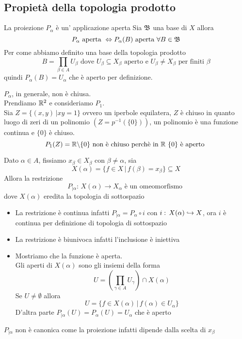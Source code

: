 \subsection{Propiet\`a della topologia prodotto}
\begin{prop}La proiezione $P_\alpha$  \`e un' applicazione aperta
\proof Sia $\mathfrak{B}$ una base di $X$ allora 
$$ P_\alpha \text{ aperta } \Leftrightarrow P_ \alpha(B) \text{ aperta } \forall B \in \mathfrak{B}$$
Per come abbiamo definito una base della topologia prodotto
$$ B = \prod_{\beta\in A }  U_\beta
 \text{ dove } U_\beta \subseteq X_\beta \text{ aperto e  } U_\beta \neq X_\beta \text{ per finiti } \beta $$
 quindi $P_\alpha(B) = U_\alpha$ che \`e aperto per definizione.
 \endproof
\end{prop}
\begin{oss}$P_\alpha$, in generale, non \`e chiusa.\\
Prendiamo $\mathbb{R}^2$ e consideriamo $P_1$.\\
Sia $Z=\{ (x,y) \, \vert xy=1 \}$ ovvero un iperbole equilatera, 
$Z$ \`e chiuso in quanto luogo di zeri di un polinomio $(Z=p^{-1}(\{ 0\} ))$, un polinomio \`e una funzione continua e $\{ 0 \} $ \`e chiuso.\\
$$P_1(Z) =\mathbb{R} \backslash \{ 0 \} \text{ non \`e chiuso perch\`e in } \mathbb{R} \text{ } \{ 0 \} \text{ \`e aperto }$$
\end{oss}
\spazio
\begin{prop}Dato $\alpha\in A $, fissiamo $x_\beta \in X_\beta $ con $\beta \neq \alpha$, sia 
$$X(\alpha) = \{ f\in X \, \vert \, f(\beta)= x_\beta \} \subseteq X $$ 
Allora la restrizione 
$$ P_{\vert \alpha} :\, X(\alpha) \to X_\alpha \text{ \`e un omeomorfismo } $$
dove $X(\alpha)$ eredita la topologia di sottospazio
\proof \bbianco
\begin{itemize}
\item La restrizione \`e continua infatti $P_{\vert \alpha} = P_\alpha \circ i $ con $i:\, X(\alpha) \hookrightarrow X $, ora $i$ \`e continua per definizione di topologia di sottospazio 
\item La restrizione \`e biunivoca infatti l'inclusione \`e iniettiva 
\item Mostriamo che la funzione \`e aperta.\\
Gli aperti di $X(\alpha)$ sono gli insiemi della forma 
$$U= \left( \prod_{\gamma \in A } U_\gamma \right) \cap X(\alpha)$$
Se $U\neq \emptyset$ allora 
$$ U = \{ f\in X(\alpha) \, \vert \,  f(\alpha)\in U_\alpha\} $$
D'altra parte $P_{\vert \alpha}(U) = P_\alpha(U) = U_\alpha$ che \`e aperto 
\end{itemize}
\endproof
\end{prop}
\begin{oss}$P_{\vert \alpha} $ non \`e canonica come la proiezione infatti dipende dalla scelta di $x_\beta$
\end{oss}

